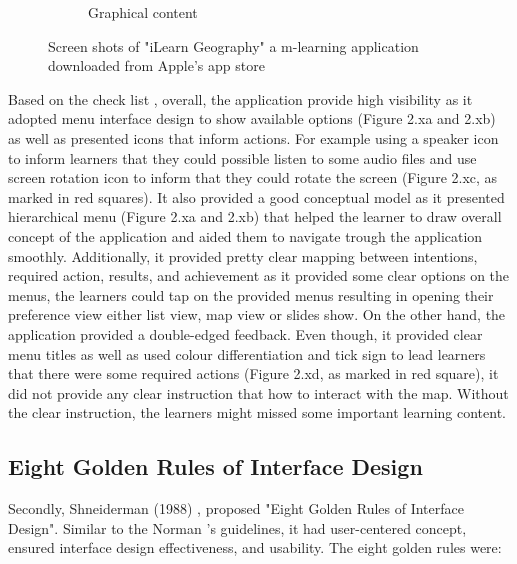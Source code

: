 \begin{figure}[!hbt]
\begin{subfigure}{0.55\textwidth}
\caption{Graphical content }
    \end{subfigure}\hspace{0.1\textwidth}
  \caption{Screen shots of "iLearn Geography" a m-learning application downloaded from Apple's app store}
\end{figure}

Based on the check list \cite{norman1988psychology}, overall, the application provide high visibility as it adopted menu interface design to show available options (Figure 2.xa and 2.xb) as well as presented icons that inform actions. For example using a speaker icon to inform learners that they could possible listen to some audio files and use screen rotation icon to inform that they could rotate the screen (Figure 2.xc, as marked in red squares). It also provided a good conceptual model as it presented hierarchical menu (Figure 2.xa and 2.xb) that helped the learner to draw overall concept of the application and aided them to navigate trough the application smoothly. Additionally, it provided pretty clear mapping between intentions, required action, results, and achievement as it provided some clear options on the menus, the learners could tap on the provided menus resulting in opening their preference view either list view, map view or slides show. On the other hand, the application provided a double-edged feedback. Even though, it provided clear menu titles as well as used colour differentiation and tick sign to lead learners that there were some required actions (Figure 2.xd, as marked in red square), it did not provide any clear instruction that how to interact with the map. Without the clear instruction, the learners might missed some important learning content. 

\subsection{Eight Golden Rules of Interface Design} 

Secondly, Shneiderman (1988) \cite{shneiderman2010designing}, proposed "Eight Golden Rules of Interface Design". Similar to the Norman \cite{norman1988psychology}'s guidelines, it had user-centered concept, ensured interface design effectiveness, and usability. The eight golden rules were: 

